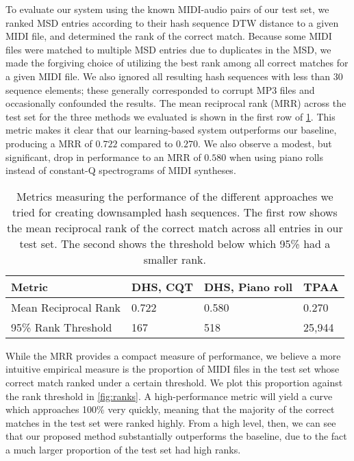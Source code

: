 To evaluate our system using the known MIDI-audio pairs of our test set, we ranked MSD entries according to their hash sequence DTW distance to a given MIDI file, and determined the rank of the correct match.
Because some MIDI files were matched to multiple MSD entries due to duplicates in the MSD, we made the forgiving choice of utilizing the best rank among all correct matches for a given MIDI file.
We also ignored all resulting hash sequences with less than 30 sequence elements; these generally corresponded to corrupt MP3 files and occasionally confounded the results.
The mean reciprocal rank (MRR) across the test set for the three methods we evaluated is shown in the first row of \cref{tab:ranking_metrics}.
This metric makes it clear that our learning-based system outperforms our baseline, producing a MRR of $0.722$ compared to $0.270$.
We also observe a modest, but significant, drop in performance to an MRR of $0.580$ when using piano rolls instead of constant-Q spectrograms of MIDI syntheses.

\begin{table}
  \begin{center}
    \begin{tabular}{l l l l}
      \toprule
      Metric & \textbf{DHS, CQT} & \textbf{DHS, Piano roll} & \textbf{TPAA} \\
      \midrule
      Mean Reciprocal Rank & 0.722 & 0.580 & 0.270 \\
      95\% Rank Threshold & 167 & 518 & 25,944 \\
      \bottomrule
    \end{tabular}
  \end{center}
  \caption{Metrics measuring the performance of the different approaches we tried for creating downsampled hash sequences.
The first row shows the mean reciprocal rank of the correct match across all entries in our test set.
The second shows the threshold below which 95\% had a smaller rank.}
  \label{tab:ranking_metrics}
\end{table}

While the MRR provides a compact measure of performance, we believe a more intuitive empirical measure is the proportion of MIDI files in the test set whose correct match ranked under a certain threshold.
We plot this proportion against the rank threshold in \cref{fig:ranks}.
A high-performance metric will yield a curve which approaches 100\% very quickly, meaning that the majority of the correct matches in the test set were ranked highly.
From a high level, then, we can see that our proposed method substantially outperforms the baseline, due to the fact a much larger proportion of the test set had high ranks.


